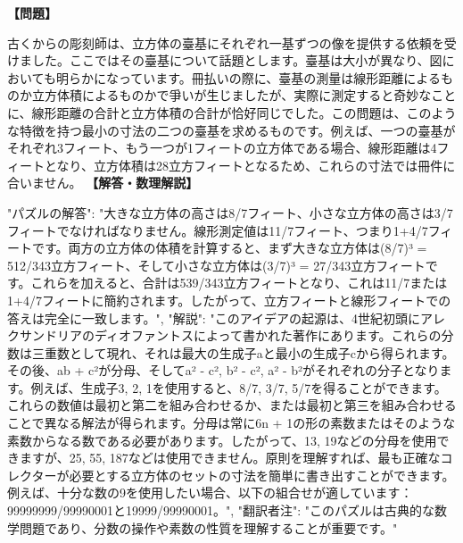 \documentclass[10pt,a4paper,oneside,openany]{ltjsbook}
\begin{document}
\begin{tcolorbox}[colback=softblue,colframe=primaryblue,title=\textbf{第 130 問：THE SCULPTOR'S PROBLEM.},arc=2mm,boxrule=1pt,breakable]
\textbf{【問題】}\par\vspace{0.3em}
古くからの彫刻師は、立方体の臺基にそれぞれ一基ずつの像を提供する依頼を受けました。ここではその臺基について話題とします。臺基は大小が異なり、図においても明らかになっています。冊払いの際に、臺基の測量は線形距離によるものか立方体積によるものかで爭いが生じましたが、実際に測定すると奇妙なことに、線形距離の合計と立方体積の合計が恰好同じでした。この問題は、このような特徴を持つ最小の寸法の二つの臺基を求めるものです。例えば、一つの臺基がそれぞれ3フィート、もう一つが1フィートの立方体である場合、線形距離は4フィートとなり、立方体積は28立方フィートとなるため、これらの寸法では冊件に合いません。
\tcblower
\textbf{【解答・数理解説】}\par\vspace{0.3em}
{
"パズルの解答": "大きな立方体の高さは8/7フィート、小さな立方体の高さは3/7フィートでなければなりません。線形測定値は11/7フィート、つまり1+4/7フィートです。両方の立方体の体積を計算すると、まず大きな立方体は(8/7)³ = 512/343立方フィート、そして小さな立方体は(3/7)³ = 27/343立方フィートです。これらを加えると、合計は539/343立方フィートとなり、これは11/7または1+4/7フィートに簡約されます。したがって、立方フィートと線形フィートでの答えは完全に一致します。",
"解説": "このアイデアの起源は、4世紀初頭にアレクサンドリアのディオファントスによって書かれた著作にあります。これらの分数は三重数として現れ、それは最大の生成子aと最小の生成子cから得られます。その後、ab + c²が分母、そしてa² - c², b² - c², a² - b²がそれぞれの分子となります。例えば、生成子3, 2, 1を使用すると、8/7, 3/7, 5/7を得ることができます。これらの数値は最初と第二を組み合わせるか、または最初と第三を組み合わせることで異なる解法が得られます。分母は常に6n + 1の形の素数またはそのような素数からなる数である必要があります。したがって、13, 19などの分母を使用できますが、25, 55, 187などは使用できません。原則を理解すれば、最も正確なコレクターが必要とする立方体のセットの寸法を簡単に書き出すことができます。例えば、十分な数の9を使用したい場合、以下の組合せが適しています：99999999/99990001と19999/99990001。",
"翻訳者注": "このパズルは古典的な数学問題であり、分数の操作や素数の性質を理解することが重要です。"
}
\end{tcolorbox}
\end{document}

